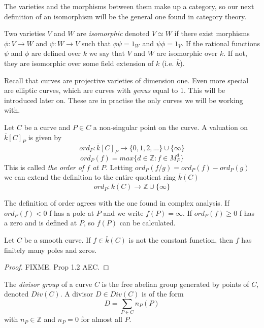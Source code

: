 \documentclass[a4paper,10pt]{amsart}
\begin{document}
The varieties and the morphisms between them make up a category, so our next
definition of an isomorphism will be the general one found in category theory.

\begin{mydef}
 Two varieties $V$ and $W$ are \emph{isomorphic} denoted $V\simeq W$
if there exist morphisms $\phi: V \rightarrow W$ and $\psi: W \rightarrow V$ such that
$\phi \psi = 1_W$ and $\psi \phi = 1_V$.
If the rational functions $\psi$ and $\phi$ are defined over $k$ we say that $V$ and $W$
are isomorphic over $k$. If not, they are isomorphic over some field extension of $k$
(i.e. $\bar{k}$).
\end{mydef}

Recall that curves are projective varieties of dimension one. Even more special
are elliptic curves, which are curves with \emph{genus} equal to 1. This will
be introduced later on. These are in practise the only curves we will be working with.

\begin{mydef}
 Let $C$ be a curve and $P\in C$ a non-singular point on the curve. A valuation on
$\bar{k}[C]_P$ is given by
$$ ord_P : \bar{k}[C]_P \rightarrow \{ 0, 1, 2, ... \} \cup \{ \infty \} $$
$$ ord_P(f) = max \{ d\in \mathbb{Z} : f\in M_P^d \} $$
This is called \emph{the order of $f$ at $P$}.
Letting $ord_P(f/g) = ord_P(f) - ord_P(g)$ we can extend the definition to the entire
quotient ring $\bar{k}(C)$
$$ ord_P: \bar{k}(C) \rightarrow \mathbb{Z}\cup \{\infty \} $$
\end{mydef}

The definition of order agrees with the one found in complex analysis.
If $ord_P(f) < 0$ f has a pole at $P$ and we write $f(P)=\infty$. 
If $ord_P(f) \ge 0$ f has a zero and is defined at $P$, so $f(P)$ can be calculated. 

\begin{prop}
 Let $C$ be a smooth curve. If $f\in \bar{k}(C)$ is not the constant function, then
$f$ has finitely many poles and zeros.
\label{prop:1}
\end{prop}
\begin{proof}
 FIXME. Prop 1.2 AEC.
\end{proof}

\begin{mydef}
 The \emph{divisor group} of a curve $C$ is the free abelian group generated by
points of $C$, denoted $Div(C)$. A divisor $D\in Div(C)$ is of the form
$$ D = \sum_{P\in C} n_P(P)$$
with $n_P\in\mathbb{Z}$ and $n_P = 0$ for almost all $P$.
\end{mydef}
\end{document}
